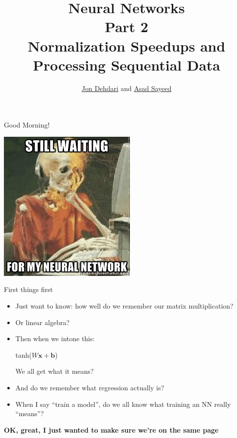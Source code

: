 \documentclass[xcolor=pdftex,x11names,table,hyperref]{beamer}
\begin{document}
\title{Neural Networks \\[1.5em]
 \small{Part 2} \\[1.0em]
 Normalization Speedups and Processing Sequential Data \\[1.0em]
 }
\author{\href{http://jon.dehdari.org}{Jon Dehdari} and \href{http://www.coli.uni-saarland.de/~asayeed/}{Asad Sayeed}}
\frame{\titlepage}

\begin{frame}{Good Morning!}
	\begin{center}
	\includegraphics[height=0.55\textheight]{images/skel_nn.jpg}
	\end{center}
\end{frame}


\begin{frame}{First things first}
  \begin{itemize}
  \item Just want to know: how well do we remember our matrix multiplication?\pause
  \item Or linear algebra?\pause
  \item Then when we intone this:
    \begin{center}
    tanh($W\mathbf{x} + \mathbf{b}$)
    \end{center}
    We all get what it means?\pause
  \item And do we remember what regression actually is?\pause
  \item When I say ``train a model'', do we all know what training an NN really ``means''?\pause
  \end{itemize}

  \begin{center}
    \textbf{OK, great, I just wanted to make sure we're on the same page}
  \end{center}

\end{frame}
\end{document}
